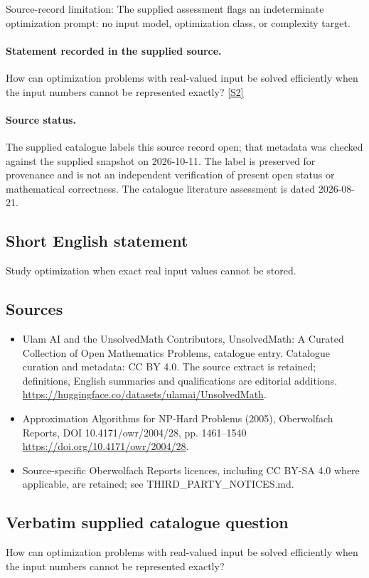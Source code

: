 \documentclass[11pt]{article}
\begin{document}
Source-record limitation: The supplied assessment flags an indeterminate optimization prompt: no input model, optimization class, or complexity target.
\paragraph{Statement recorded in the supplied source.}
How can optimization problems with real-valued input be solved efficiently when the input numbers cannot be represented exactly? \href{https://doi.org/10.4171/owr/2004/28}{[S2]}
\paragraph{Source status.}
The supplied catalogue labels this source record open; that metadata was checked against the supplied snapshot on 2026-10-11. The label is preserved for provenance and is not an independent verification of present open status or mathematical correctness. The catalogue literature assessment is dated 2026-08-21.
\subsection{Short English statement}
Study optimization when exact real input values cannot be stored.
\subsection{Sources}
\begin{itemize}
\item[S1] Ulam AI and the UnsolvedMath Contributors, UnsolvedMath: A Curated Collection of Open Mathematics Problems, catalogue entry. Catalogue curation and metadata: CC BY 4.0. The source extract is retained; definitions, English summaries and qualifications are editorial additions.
\url{https://huggingface.co/datasets/ulamai/UnsolvedMath}.
\item[S2] Approximation Algorithms for NP-Hard Problems (2005), Oberwolfach Reports, DOI 10.4171/owr/2004/28, pp. 1461--1540
\url{https://doi.org/10.4171/owr/2004/28}.
\item Source-specific Oberwolfach Reports licences, including CC BY-SA 4.0 where applicable, are retained; see THIRD\_PARTY\_NOTICES.md.
\end{itemize}
\subsection{Verbatim supplied catalogue question}
How can optimization problems with real-valued input be solved efficiently when the input numbers cannot be represented exactly?
\end{document}
